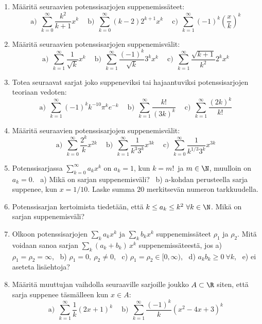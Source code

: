 \Harj
\begin{enumerate}

\item
Määritä seuraavien potenssisarjojen suppenemissäteet:
\[
\text{a)}\ \  \sum_{k=0}^\infty \frac{k^2}{k+1}x^k \quad\ 
\text{b)}\ \ \sum_{k=0}^\infty (k-2)2^{k+1}x^k \quad\
\text{c)}\ \  \sum_{k=1}^\infty (-1)^k (\frac{x}{k})^k
\]

\item
Määritä seuraavien potenssisarjojen suppenemisvälit:
\[
\text{a)}\ \ \sum_{k=1}^\infty \frac{1}{\sqrt{k}} x^k \quad\ 
\text{b)}\ \ \sum_{k=1}^\infty \frac{(-1)^k}{\sqrt{k}} 3^k x^k \quad\
\text{c)} \ \ \sum_{k=1}^\infty \frac{\sqrt{k+1}}{k^2} 2^k x^k
\]

\item
Totea seuraavat sarjat joko suppeneviksi tai hajaantuviksi potenssisarjojen teoriaan vedoten:
\[
\text{a)}\ \ \sum_{k=1}^\infty (-1)^k k^{-10} \pi^k e^{-k} \quad\ 
\text{b)}\ \ \sum_{k=1}^\infty \frac{k!}{(3k)^k} \quad\
\text{c)}\ \ \sum_{k=1}^\infty \frac{(2k)^k}{k!}
\]

\item
Määritä seuraavien potenssisarjojen suppenemisvälit:
\[
\text{a)}\ \ \sum_{k=0}^\infty \frac{2^k}{k} x^{2k} \quad\ 
\text{b)}\ \ \sum_{k=1}^\infty \frac{1}{k^3 3^k} x^{3k} \quad \
\text{c)}\ \ \sum_{k=0}^\infty \frac{1}{k^{1/3} 3^k} x^{3k}
\]

\item
Potenssisarjassa $\sum_{k=0}^\infty a_k x^k$ on $a_k=1$, kun $k=m!\,$ ja $m\in\N$, muulloin on
$a_k=0$. \ a) Mikä on sarjan suppenemisväli? \ b) a-kohdan perusteella sarja suppenee, kun 
$x=1/10$. Laske summa $20$ merkitsevän numeron tarkkuudella.

\item
Potenssisarjan kertoimista tiedetään, että $k \le a_k \le k^2\ \forall k\in\N$. Mikä on sarjan
suppenemisväli?

\item
Olkoon potenssisarjojen $\sum_k a_k x^k$ ja $\sum_k b_k x^k$ suppenemissäteet $\rho_1$ ja
$\rho_2$. Mitä voidaan sanoa sarjan $\sum_k(a_k+b_k)\,x^k$ suppenemissäteestä, jos \newline
a) $\rho_1=\rho_2=\infty$, \ b) $\rho_1=0,\ \rho_2 \neq 0$, \ c) $\rho_1=\rho_2\in[0,\infty)$,
\ d) $a_k b_k \ge 0\ \forall k$, \ e) ei aseteta lisäehtoja?

\item
Määritä muuttujan vaihdolla seuraaville sarjoille joukko $A\subset\R$ siten, että sarja 
suppenee täsmälleen kun $x \in A$:
\[
\text{a)}\ \ \sum_{k=1}^\infty \frac{1}{k} (2x+1)^k \quad\ 
\text{b)}\ \ \sum_{k=1}^\infty \frac{(-1)^k}{k}(x^2-4x+3)^k
\]


\end{enumerate}

